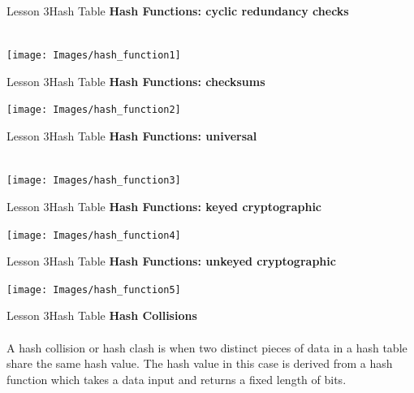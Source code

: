 \documentclass[aspectratio=1610]{beamer}
\begin{document}
\begin{frame}{Lesson 3}{Hash Table}
\LARGE
\textbf{Hash Functions: cyclic redundancy checks}\\~\\
\begin{center}
\texttt{[image: Images/hash\_function1]}
\end{center}
\end{frame}


\begin{frame}{Lesson 3}{Hash Table}
\LARGE
\textbf{Hash Functions: checksums}\\
\begin{center}
\texttt{[image: Images/hash\_function2]}
\end{center}
\end{frame}



\begin{frame}{Lesson 3}{Hash Table}
\LARGE
\textbf{Hash Functions: universal}\\~\\
\begin{center}
\texttt{[image: Images/hash\_function3]}
\end{center}
\end{frame}



\begin{frame}{Lesson 3}{Hash Table}
\LARGE
\textbf{Hash Functions: keyed cryptographic}\\
\begin{center}
\texttt{[image: Images/hash\_function4]}
\end{center}
\end{frame}


\begin{frame}{Lesson 3}{Hash Table}
\LARGE
\textbf{Hash Functions: unkeyed cryptographic}\\
\begin{center}
\texttt{[image: Images/hash\_function5]}
\end{center}
\end{frame}



\begin{frame}{Lesson 3}{Hash Table}
\LARGE
\textbf{Hash Collisions}\\~\\
A hash collision or hash clash is when two distinct pieces of data in a hash
table share the same hash value. The hash value in this case is derived from a
hash function which takes a data input and returns a fixed length of bits.
\end{frame}
\end{document}
